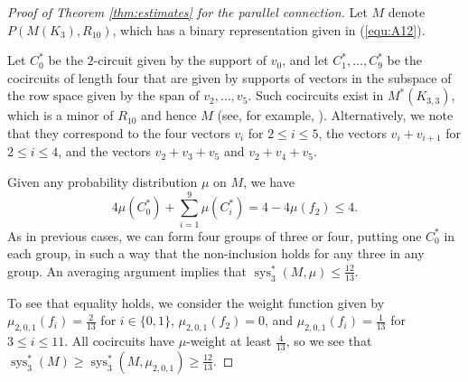 \documentclass[reqno,12pt]{amsart}
\numberwithin{theorem}{section}
\theoremstyle{plain}
\theoremstyle{definition}
\theoremstyle{remark}
\numberwithin{equation}{section}
\numberwithin{table}{section}
\DeclareMathOperator{\sys}{sys}
\begin{document}
\begin{proof}[Proof of Theorem \ref{thm:estimates} for the parallel connection] 
Let $M$ denote $P(M(K_3), R_{10})$, which has a binary representation given in (\ref{equ:A12}).
    
     Let $C_0^*$ be the $2$-circuit given by the support of $v_0$, and let $C_1^*, \ldots, C_9^*$ be the cocircuits of length four that are given by supports of vectors in the subspace of the row space given by the span of $v_2,\ldots,v_5$. Such cocircuits exist in $M^*(K_{3,3})$, which is a minor of $R_{10}$ and hence $M$ (see, for example, \cite[Lemma 6.6.9]{Oxley-book}). Alternatively, we note that they correspond to the four vectors $v_i$ for $2 \leq i \leq 5$, the vectors $v_i+v_{i+1}$ for $2 \leq i \leq 4$, and the vectors $v_2+v_3+v_5$ and $v_2+v_4+v_5$.

Given any probability distribution $\mu$ on $M$, we have
    \[4\mu(C_0^*) + \sum_{i=1}^9 \mu(C_i^*) = 4 - 4\mu(f_2) \leq 4.\]
As in previous cases, we can form four groups of three or four, putting one $C_0^*$ in each group, in such a way that the non-inclusion holds for any three in any group. An averaging argument implies that $\sys_3^*(M, \mu) \leq \tfrac{12}{13}$.

To see that equality holds, we consider the weight function given by $\mu_{2,0,1}(f_i) = \tfrac 2 {13}$ for $i \in \{0,1\}$, $\mu_{2,0,1}(f_2) = 0$, and $\mu_{2,0,1}(f_i) = \tfrac 1 {13}$ for $3 \leq i \leq 11$. All cocircuits have $\mu$-weight at least $\tfrac{4}{13}$, so we see that $\sys_3^*(M) \geq \sys_3^*(M, \mu_{2,0,1}) \geq \tfrac{12}{13}$.
\end{proof}
\end{document}
